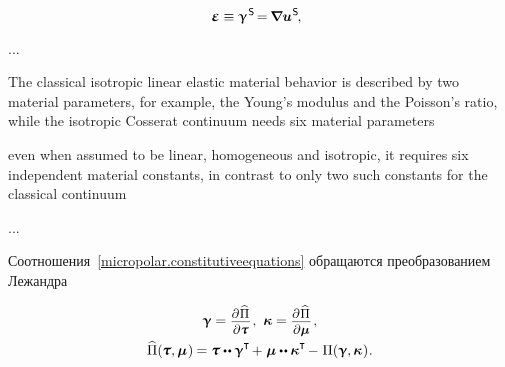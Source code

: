 \begin{otherlanguage}{russian}
\begin{equation*}
\infinitesimaldeformation \equiv \distortiontensor^{\hspace{.2ex}\mathsf{S}} \hspace{-0.32ex} = \hspace{-0.2ex} \boldnabla {\fieldofdisplacements}^{\hspace{.1ex}\mathsf{S}} \hspace{-0.25ex} , \:\:
\end{equation*}

...

{\small%
The classical isotropic linear elastic material behavior is described by two material parameters, for example, the Young’s modulus and the Poisson’s ratio, while the isotropic Cosserat continuum needs six material parameters

even when assumed to be linear, homogeneous and isotropic, it requires six independent material constants, in contrast to only two such constants for the classical continuum
\par}

...

Соотношения~\eqref{micropolar.constitutiveequations} обращаются преобразованием Лежандра

\nopagebreak\vspace{-0.2em}\begin{equation}
\begin{array}{c}
\distortiontensor = \scalebox{0.92}[0.92]{$ \displaystyle \frac{\raisemath{-0.125em}{\partial\hspace{.1ex} \widehat{\potentialenergydensity}^{\mathstrut}}}{\partial \forcestresstensor}$}
\hspace{.15ex} ,
\hspace{.8ex}
\wrynesstensor = \scalebox{0.92}[0.92]{$ \displaystyle \frac{\raisemath{-0.125em}{\partial\hspace{.1ex} \widehat{\potentialenergydensity}^{\mathstrut}}}{\partial \couplestresstensor}$}
\hspace{.2ex} ,
\\[.8em]
%
\widehat{\potentialenergydensity}(\hspace{-0.1ex} \forcestresstensor, \couplestresstensor \hspace{.12ex}) \hspace{-0.12ex}
= \forcestresstensor \dotdotp \distortiontensor^{\T} \hspace{-0.25ex}
+ \hspace{.1ex} \couplestresstensor \dotdotp \wrynesstensor^{\T} \hspace{-0.2ex}
- \hspace{.1ex} \potentialenergydensity (\distortiontensor , \wrynesstensor \hspace{.12ex})
\hspace{.1ex} .
\end{array}
\end{equation}


\end{otherlanguage}
